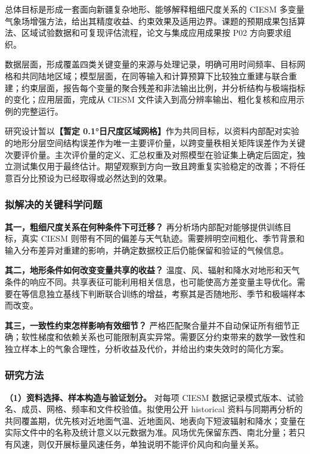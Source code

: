 总体目标是形成一套面向新疆复杂地形、能够解释粗细尺度关系的 CIESM 多变量气象场增强方法，给出其精度收益、约束效果及适用边界。课题的预期成果包括算法、区域试验数据和可复现评估流程，论文与集成应用成果按 P02 方向要求组织。

数据层面，形成覆盖四类关键变量的来源与处理记录，明确可用时间频率、目标网格和共同陆地区域；模型层面，在同等输入和计算预算下比较独立重建与联合重建；约束层面，报告每个变量的聚合残差和非法输出比例，并分析结构与极端指标的变化；应用层面，完成从 CIESM 文件读入到高分辨率输出、粗化复核和应用示例的完整运行。

研究设计暂以\textbf{【暂定 0.1°日尺度区域网格】}作为共同目标，以资料内部配对实验的地形分层空间结构误差作为唯一主要评价量，以跨变量秩相关矩阵误差作为关键次要评价量。主次评价量的定义、汇总权重及对照模型在验证集上确定后固定，独立测试集仅用于最终估计。期望观察到方向一致且跨重复实验稳定的改善；不将任意百分比预设为已经取得或必然达到的效果。

\subsubsection{拟解决的关键科学问题}

\textbf{其一，粗细尺度关系在何种条件下可迁移？}
再分析场内部配对能够提供训练目标，真实 CIESM 则带有不同的偏差与天气轨迹。需要辨明空间粗化、季节背景和输入分布差异对重建的影响，并确定数据校正后仍能保留和验证的气候信息。

\textbf{其二，地形条件如何改变变量共享的收益？}
温度、风、辐射和降水对地形和天气条件的响应不同。共享表征可能利用相关信息，也可能使高方差变量主导优化。需要在等信息独立基线下判断联合训练的增益，考察其是否随地形、季节和极端样本而改变。

\textbf{其三，一致性约束怎样影响有效细节？}
严格匹配聚合量并不自动保证所有细节正确；软性梯度和依赖关系也可能限制真实异常。需要区分约束带来的数学一致性和独立样本上的气象合理性，分析收益及代价，并给出约束失效时的简化方案。

\subsubsection{研究方法}

\textbf{（1）资料选择、样本构造与验证划分。}
对每项 CIESM 数据记录模式版本、试验名、成员、网格、频率和文件校验值。拟使用公开 historical 资料与同期再分析的共同覆盖期，优先核对近地面气温、近地面风、地表向下短波辐射和降水；变量在实际文件中的名称及统计意义以元数据为准。风场优先保留东西、南北分量；若只有风速，则仅开展标量风速任务，单独说明不能评价风向和向量关系。

